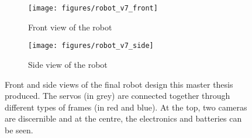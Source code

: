 \begin{figure}[htp]
\center
\begin{subfigure}[b]{0.45\textwidth}
    \texttt{[image: figures/robot\_v7\_front]}
    \caption[]{Front view of the robot}
    \label{fig:abstract_robot1}
\end{subfigure}
\hfill
\begin{subfigure}[b]{0.45\textwidth}
\center
    \texttt{[image: figures/robot\_v7\_side]}
    \caption[]{Side view of the robot}
    \label{fig:abstract_robot2}
\end{subfigure}
\caption[]{Front and side views of the final robot design this master thesis produced. The servos (in grey) are connected together through different types of frames (in red and blue). At the top, two cameras are discernible and at the centre, the electronics and batteries can be seen.}
\label{fig:abstract2}
\end{figure}